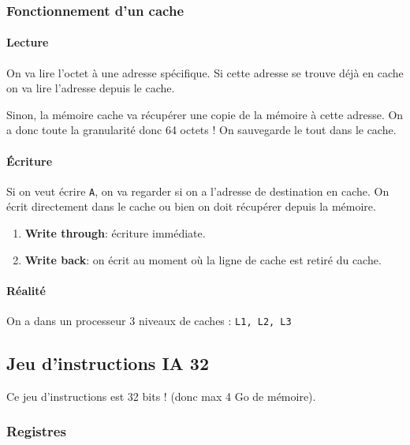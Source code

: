 \subsubsection{Fonctionnement d'un
cache}\label{fonctionnement-dun-cache}

\paragraph{Lecture}\label{lecture}

On va lire l'octet à une adresse spécifique. Si cette adresse se trouve
déjà en cache on va lire l'adresse depuis le cache.

Sinon, la mémoire cache va récupérer une copie de la mémoire à cette
adresse. On a donc toute la granularité donc 64 octets ! On sauvegarde
le tout dans le cache.

\paragraph{Écriture}\label{uxe9criture}

Si on veut écrire \texttt{A}, on va regarder si on a l'adresse de
destination en cache. On écrit directement dans le cache ou bien on doit
récupérer depuis la mémoire.

\begin{enumerate}
\def\labelenumi{\arabic{enumi}.}
\tightlist
\item
  \textbf{Write through}: écriture immédiate.
\item
  \textbf{Write back}: on écrit au moment où la ligne de cache est
  retiré du cache.
\end{enumerate}

\paragraph{Réalité}\label{ruxe9alituxe9}

On a dans un processeur 3 niveaux de caches : \texttt{L1,\ L2,\ L3}

\subsection{Jeu d'instructions IA 32}\label{jeu-dinstructions-ia-32}

Ce jeu d'instructions est 32 bits ! (donc max 4 Go de mémoire).

\subsubsection{Registres}\label{registres}

